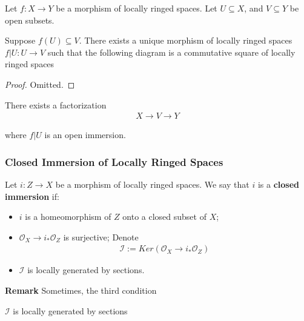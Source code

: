 \documentclass[Total.tex]{subfiles}
\begin{document}
					\begin{lemma}
						Let $f:X\rightarrow Y$ be a morphism of locally ringed spaces. Let $U\subseteq X$, and $V\subseteq Y$ be open subsets.
						
						Suppose $f(U)\subseteq V$. There exists a unique morphism of locally ringed spaces $f|U:U\rightarrow V$ such that the following diagram is a commutative square of locally ringed spaces
						\begin{center}
						\end{center}
					\end{lemma}
					\begin{proof}
						Omitted.
					\end{proof}
					
					There exists a factorization
					\begin{gather*}
						X\rightarrow V\rightarrow Y
					\end{gather*}
					
					where $f|U$ is an open immersion.
			
			\subsubsection{Closed Immersion of Locally Ringed Spaces}	
				\begin{Def}
					Let $i:Z\rightarrow X$ be a morphism of locally ringed spaces. We say that $i$ is a \textbf{closed immersion} if:
					\begin{itemize}
						\item $i$ is a homeomorphism of $Z$ onto a closed subset of $X$;
						\item $\mathcal{O}_X\rightarrow i_*\mathcal{O}_Z$ is surjective; Denote
						\begin{gather*}
							\mathcal{I}:=Ker(\mathcal{O}_X\rightarrow i_*\mathcal{O}_Z)
						\end{gather*}
						\item $\mathcal{I}$ is locally generated by sections.
					\end{itemize}
				\end{Def}
				
				\textbf{Remark} Sometimes, the third condition
				\begin{center}
					$\mathcal{I}$ is locally generated by sections
				\end{center}
				
\end{document}
